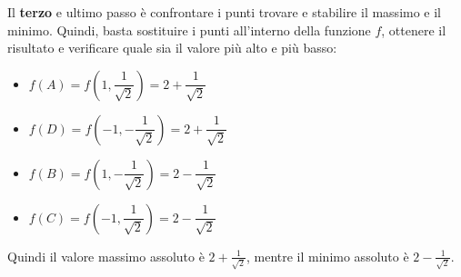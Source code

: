 \documentclass[a4paper]{article}
\begin{document}
	\noindent
	Il \textbf{terzo} e ultimo passo è confrontare i punti trovare e stabilire il massimo e il minimo. Quindi, basta sostituire i punti all'interno della funzione $f$, ottenere il risultato e verificare quale sia il valore più alto e più basso:
	\begin{itemize}
		\item $f\left(A\right) = f\left(1, \dfrac{1}{\sqrt{2}}\right) = 2+\dfrac{1}{\sqrt{2}}$
		\item $f\left(D\right) = f\left(-1, -\dfrac{1}{\sqrt{2}}\right) = 2+\dfrac{1}{\sqrt{2}}$
		\item $f\left(B\right) = f\left(1, -\dfrac{1}{\sqrt{2}}\right) = 2-\dfrac{1}{\sqrt{2}}$
		\item $f\left(C\right) = f\left(-1, \dfrac{1}{\sqrt{2}}\right) = 2-\dfrac{1}{\sqrt{2}}$
	\end{itemize}
	Quindi il valore massimo assoluto è $2+\frac{1}{\sqrt{2}}$, mentre il minimo assoluto è $2-\frac{1}{\sqrt{2}}$.\newpage
\end{document}
